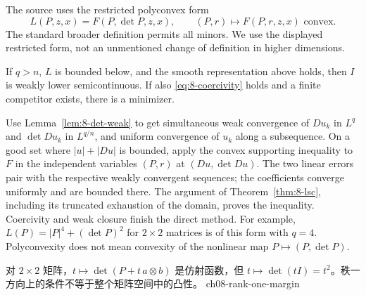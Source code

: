 The source uses the restricted polyconvex form
\[
 L(P,z,x)=F(P,\det P,z,x),\qquad (P,r)\mapsto F(P,r,z,x)
 \text{ convex}.
\]
The standard broader definition permits all minors. We use the displayed
restricted form, not an unmentioned change of definition in higher dimensions.
\Needspace{55mm}
\begin{theorem}
If $q>n$, $L$ is bounded below, and the smooth representation above holds,
then $I$ is weakly lower semicontinuous. If also
\eqref{eq:8-coercivity} holds and a finite competitor exists, there is a minimizer.
\end{theorem}
\begin{expandedproof}
Use Lemma~\ref{lem:8-det-weak} to get simultaneous weak convergence
of $Du_k$ in $L^q$ and $\det Du_k$ in $L^{q/n}$, and uniform convergence
of $u_k$ along a subsequence. On a good set where $|u|+|Du|$ is bounded,
apply the convex supporting inequality to $F$ in the independent variables
$(P,r)$ at $(Du,\det Du)$. The two linear errors pair with the respective
weakly convergent sequences; the coefficients converge uniformly and
are bounded there. The argument of Theorem~\ref{thm:8-lsc}, including
its truncated exhaustion of the domain, proves the inequality.
Coercivity and weak closure finish the direct method.
For example, $L(P)=|P|^4+(\det P)^2$ for $2\times2$ matrices is of this
form with $q=4$. Polyconvexity does not mean convexity of the nonlinear
map $P\mapsto(P,\det P)$.
\end{expandedproof}

{对 $2\times2$ 矩阵，$t\mapsto\det(P+t\,a\otimes b)$ 是仿射函数，但 $t\mapsto\det(tI)=t^2$。秩一方向上的条件不等于整个矩阵空间中的凸性。}
{ch08-rank-one-margin}

\Needspace{45mm}
